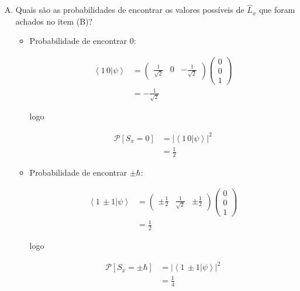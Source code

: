 \documentclass[a4paper, 12pt, notitlepage]{article}
\begin{document}
\begin{enumerate}
\begin{enumerate}[(A)]
\begin{itemize}
  \end{itemize}
  
  \item Quais são as probabilidades de encontrar os valores possíveis de $\hat{L}_x$ que foram achados no item (B)?
  
  \begin{itemize}
    \item Probabilidade de encontrar $0$:
    
    \begin{align*}
      \left\langle 1\,0|\psi\right\rangle &=
      \begin{pmatrix} 
      \frac{1}{\sqrt{2}} & 0 & -\frac{1}{\sqrt{2}} 
      \end{pmatrix} 
      \begin{pmatrix}
       0 \\ 0 \\ 1
      \end{pmatrix}
      \\
      &= -\frac{1}{\sqrt{2}}
    \end{align*}
    
    \noindent logo
    
    \begin{align*}
    \mathcal{P}\left[S_x = 0\right] &= \left|\left\langle 1\,0|\psi\right\rangle\right|^2 \\
    &= \frac{1}{2}
    \end{align*}
    
    \item Probabilidade de encontrar $\pm\hbar$:
    
    \begin{align*}
      \left\langle 1\,\pm 1|\psi\right\rangle &=
      \begin{pmatrix} 
      \pm\frac{1}{2} & \frac{1}{\sqrt{2}} & \pm\frac{1}{2} 
      \end{pmatrix} 
      \begin{pmatrix}
       0 \\ 0 \\ 1
      \end{pmatrix}
      \\
      &= \frac{1}{2}
    \end{align*}
    
    \noindent logo
    
    \begin{align*}
    \mathcal{P}\left[S_x = \pm\hbar\right] &= \left|\left\langle 1\,\pm 1|\psi\right\rangle\right|^2 \\
    &= \frac{1}{4}
    \end{align*}
  \end{itemize}
  

\end{enumerate}
\end{enumerate}
\end{document}
